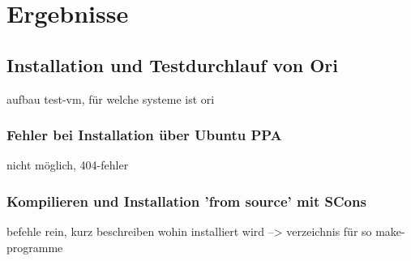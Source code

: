 
\section{Ergebnisse}
\label{sec:Ergebnisse}

\subsection{Installation und Testdurchlauf von Ori}
aufbau test-vm, für welche systeme ist ori
\subsubsection{Fehler bei Installation über Ubuntu PPA}
nicht möglich, 404-fehler
\subsubsection{Kompilieren und Installation 'from source' mit SCons}
befehle rein, kurz beschreiben wohin installiert wird --> verzeichnis für so make-programme

%
%
%
